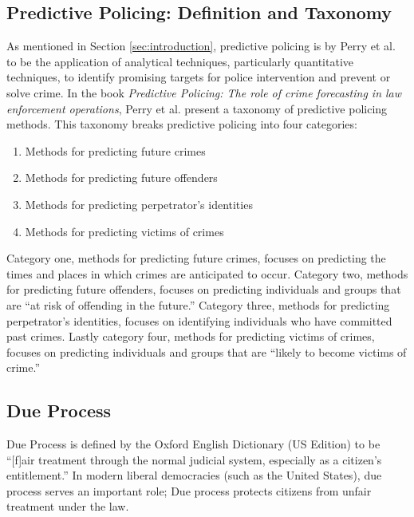 \documentclass[12pt]{article} %
\newcommand{\hlfixme}[1]{\fxfatal{\hl{#1}}}
\begin{document}
\subsection{Predictive Policing: Definition and Taxonomy} \label{subsec:predictivepolicing}%

As mentioned in Section \ref{sec:introduction}, predictive policing is by Perry et al. to be the application of analytical techniques, particularly quantitative techniques, to identify promising targets for police intervention and prevent or solve crime. In the book \textit{Predictive Policing: The role of crime forecasting in law enforcement operations}, Perry et al. present a taxonomy of predictive policing methods. This taxonomy breaks predictive policing into four categories: \cite{perryetal}

\begin{enumerate}
\item Methods for predicting future crimes
\item Methods for predicting future offenders
\item Methods for predicting perpetrator's identities
\item Methods for predicting victims of crimes
\end{enumerate}

Category one, methods for predicting future crimes, focuses on predicting the times and places in which crimes are anticipated to occur. Category two, methods for predicting future offenders, focuses on predicting individuals and groups that are ``at risk of offending in the future.'' Category three, methods for predicting perpetrator's identities, focuses on identifying individuals who have committed past crimes. Lastly category four, methods for predicting victims of crimes, focuses on predicting individuals and groups that are ``likely to become victims of crime.''

\subsection{Due Process} \label{subsec:dueprocess}
Due Process is defined by the Oxford English Dictionary (US Edition) to be ``[f]air treatment through the normal judicial system, especially as a citizen’s entitlement.'' In modern liberal democracies (such as the United States), due process serves an important role; Due process protects citizens from unfair treatment under the law. 
\end{document}

